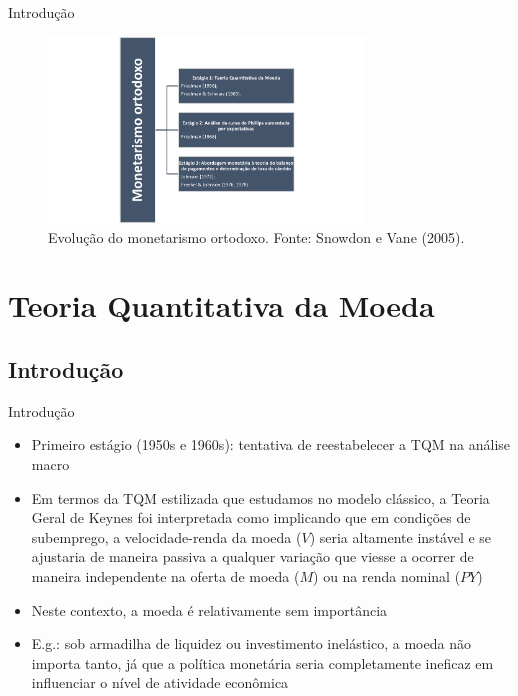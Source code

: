 \documentclass[10pt]{beamer}
\begin{document}
\begin{frame}{Introdução}
    \begin{figure}
        \centering
        \includegraphics[width=0.75\textwidth]{./figures/aula9_fig1.png}
        \caption{Evolução do monetarismo ortodoxo. Fonte: Snowdon e Vane (2005).}
        \label{fig1}
    \end{figure}
\end{frame}

\section{Teoria Quantitativa da Moeda}
\subsection{Introdução}
\begin{frame}{Introdução}
    \begin{itemize}
        \item Primeiro estágio (1950s e 1960s): tentativa de reestabelecer a TQM na análise macro
        \bigskip
        \item Em termos da TQM estilizada que estudamos no modelo clássico, a Teoria Geral de Keynes foi interpretada como implicando que em condições de subemprego, a velocidade-renda da moeda ($V$) seria altamente instável e se ajustaria de maneira passiva a qualquer variação que viesse a ocorrer de maneira independente na oferta de moeda ($M$) ou na renda nominal ($PY$)
        \bigskip
        \item Neste contexto, a moeda é relativamente sem importância \bigskip
        \item E.g.: sob armadilha de liquidez ou investimento inelástico, a moeda não importa tanto, já que a política monetária seria completamente ineficaz em influenciar o nível de atividade econômica
    \end{itemize}
\end{frame}
\end{document}
